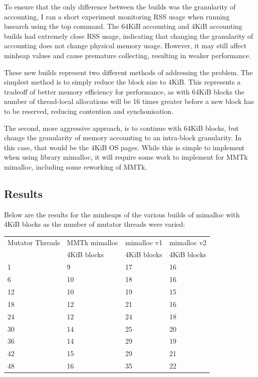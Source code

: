 \documentclass{article}
\begin{document}
To ensure that the only difference between the builds was the granularity of accounting, I ran a short experiment monitoring RSS usage when running lusearch using the top command. The 64KiB accounting and 4KiB accounting builds had extremely close RSS usage, indicating that changing the granularity of accounting does not change physical memory usage. However, it may still affect minheap values and cause premature collecting, resulting in weaker performance.

These new builds represent two different methods of addressing the problem. The simplest method is to simply reduce the block size to 4KiB. This represents a tradeoff of better memory efficiency for performance, as with 64KiB blocks the number of thread-local allocations will be 16 times greater before a new block has to be reserved, reducing contention and synchonisation.

The second, more aggressive approach, is to continue with 64KiB blocks, but change the granularity of memory accounting to an intra-block granularity. In this case, that would be the 4KiB OS pages. While this is simple to implement when using library mimalloc, it will require some work to implement for MMTk mimalloc, including some reworking of MMTk.

\subsection{Results}
Below are the results for the minheaps of the various builds of mimalloc with 4KiB blocks as the number of mutator threads were varied:
\begin{center}
    \begin{tabular}{|l|l|l|l|}
        \hline
        Mutator Threads & MMTk mimalloc & mimalloc v1 & mimalloc v2\\
        & 4KiB blocks & 4KiB blocks & 4KiB blocks\\
        \hline
        1 & 9 & 17 & 16\\
        \hline
        6 & 10 & 18 & 16\\
        \hline
        12 & 10 & 19 & 15\\
        \hline
        18 & 12 & 21 & 16\\
        \hline
        24 & 12 & 24 & 18\\
        \hline
        30 & 14 & 25 & 20\\
        \hline
        36 & 14 & 29 & 19\\
        \hline
        42 & 15 & 29 & 21\\
        \hline
        48 & 16 & 35 & 22\\
        \hline
    \end{tabular}
\end{center}
\end{document}
